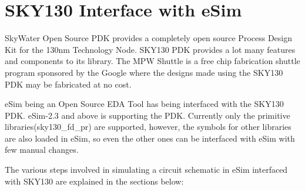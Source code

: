 \chapter{SKY130 Interface with eSim}
\label{chap9}
\thispagestyle{empty}

SkyWater Open Source PDK provides a completely open source Process Design Kit for the 130nm Technology Node. SKY130 PDK provides a lot many features and components to its library. The MPW Shuttle is a free chip fabrication shuttle program sponsored by the Google where the designs made using the SKY130 PDK may be fabricated at no cost.

eSim being an Open Source EDA Tool has being interfaced with the SKY130 PDK. eSim-2.3 and above is supporting the PDK. Currently only the primitive libraries(sky130\_fd\_pr) are supported, however, the symbols for other libraries are also loaded in eSim, so even the other ones can be interfaced with eSim with few manual changes.

The various steps involved in simulating a circuit schematic in eSim interfaced with SKY130 are explained in the sections below:
